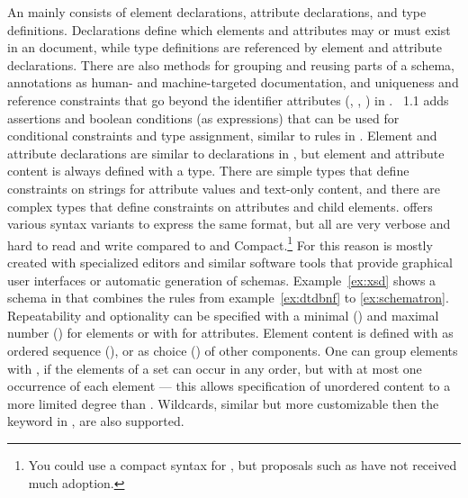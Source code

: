 An  mainly consists of element declarations, attribute
declarations, and type definitions. Declarations define which 
elements and attributes may or must exist in an  document, while type
definitions are referenced by element and attribute declarations. There are
also methods for grouping and reusing parts of a schema, annotations as human-
and machine-targeted documentation, and uniqueness and reference constraints
that go beyond the identifier attributes (, , )
in .  ~1.1 adds assertions and boolean conditions (as
 expressions) that can be used for conditional constraints and type
assignment, similar to rules in .  Element and attribute
declarations are similar to declarations in , but element and
attribute content is always defined with a type.  There are simple types that
define constraints on strings for attribute values and text-only content, and
there are complex types that define constraints on attributes and child
elements.  offers various syntax variants to express the same format,
but all are very verbose and hard to read and write compared to  and
 Compact.\footnote{You could use a compact syntax for
, but proposals such as \textcite{Wilde2003} have not received much
adoption.} For this reason  is mostly created with specialized
 editors and similar software tools that provide graphical user
interfaces or automatic generation of schemas.  Example~\ref{ex:xsd} shows a
schema in  that combines the rules from example~\ref{ex:dtdbnf} to
\ref{ex:schematron}.  Repeatability and optionality can be specified with a
minimal () and maximal number () for elements or
with  for attributes.  Element content is defined with
 as ordered sequence (), or as choice
() of other components. One can group elements with
, if the elements of a set can occur in any order, but with at most
one occurrence of each element --- this allows specification of unordered
content to a more limited degree than . Wildcards, similar but
more customizable then the  keyword in , are also supported.

